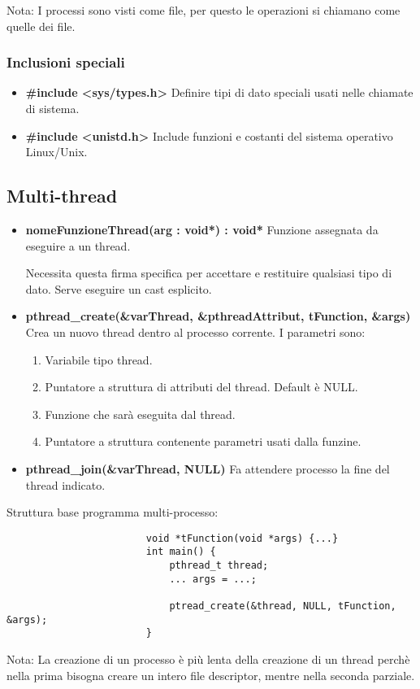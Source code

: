 Nota: I processi sono visti come file, per questo le operazioni si chiamano come quelle dei file.

\subsubsection{Inclusioni speciali}
\begin{itemize}
	\item \textbf{\#include <sys/types.h>} Definire tipi di dato speciali usati nelle chiamate di sistema.
	\item \textbf{\#include <unistd.h>} Include funzioni e costanti del sistema operativo Linux/Unix.
\end{itemize}

\subsection{Multi-thread}
\begin{itemize}
	\item \textbf{nomeFunzioneThread(arg : void*) : void*} Funzione assegnata da eseguire a un thread.

	Necessita questa firma specifica per accettare e restituire qualsiasi tipo di dato. Serve eseguire un cast esplicito.
	\item \textbf{pthread\_create(\&varThread, \&pthreadAttribut, tFunction, \&args)} Crea un nuovo thread dentro al processo corrente. I parametri sono:
	\begin{enumerate}
		\item Variabile tipo thread.
		\item Puntatore a struttura di attributi del thread. Default è NULL.
		\item Funzione che sarà eseguita dal thread.
		\item Puntatore a struttura contenente parametri usati dalla funzine.
	\end{enumerate}
	\item \textbf{pthread\_join(\&varThread, NULL)} Fa attendere processo la fine del thread indicato.
\end{itemize}

Struttura base programma multi-processo:
\begin{verbatim}
						void *tFunction(void *args) {...}
						int main() {
							pthread_t thread;
							... args = ...;

							ptread_create(&thread, NULL, tFunction, &args);
						}
\end{verbatim}

Nota: La creazione di un processo è più lenta della creazione di un thread perchè nella prima bisogna creare un intero file descriptor, mentre nella seconda parziale.